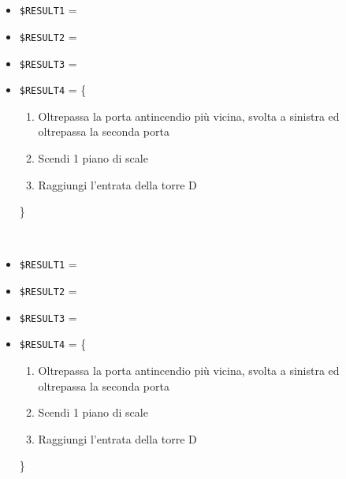 \documentclass[../../SperimentazioniPratiche.tex]{subfiles}
\begin{document}
\begin{tcolorbox}[fonttitle=\bfseries, 
								adjusted title={\Large Prova 11A.1}, 
								breakable, 
								sharp corners=south,
								colback=white, 
								colframe=white!60!black]
\begin{description}[leftmargin=0.7cm,labelwidth=!]
        			\item[Output riscontrato] \ \par
        				\begin{description}
        				
        					\item[\dispositivoA] \ \par
        					\begin{itemize}
        						\item \verb|$RESULT1| = \ns
        						\item \verb|$RESULT2| = \ns
        						\item \verb|$RESULT3| = \ns
        						\item \verb|$RESULT4| = \{
        								\begin{enumerate}
        									\item Oltrepassa la porta antincendio più vicina, svolta a sinistra ed oltrepassa la seconda porta
        									\item Scendi 1 piano di scale
        									\item Raggiungi l'entrata della torre D
        								\end{enumerate}
        							\}
        					\end{itemize}      					
        					
        					\item[\dispositivoB] \ \par
        					\begin{itemize}
        						\item \verb|$RESULT1| = \ns
        						\item \verb|$RESULT2| = \ns
        						\item \verb|$RESULT3| = \ns
        						\item \verb|$RESULT4| = \{
        								\begin{enumerate}
        									\item Oltrepassa la porta antincendio più vicina, svolta a sinistra ed oltrepassa la seconda porta
        									\item Scendi 1 piano di scale
        									\item Raggiungi l'entrata della torre D
        								\end{enumerate}
        							\}
        					\end{itemize}
        					
        				\end{description}
        				

\end{description}
\end{tcolorbox}
\end{document}

